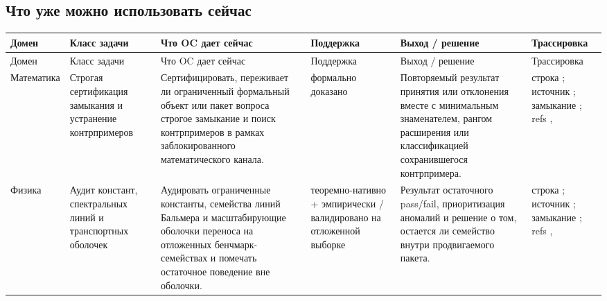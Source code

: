 \subsection{Что уже можно использовать сейчас}
\begingroup
\scriptsize
\setlength{\emergencystretch}{1.5em}
\setlength{\tabcolsep}{2pt}
\setlength{\LTleft}{0pt}
\setlength{\LTright}{0pt}
\begin{longtable}{@{}L{0.11\textwidth}L{0.16\textwidth}L{0.19\textwidth}L{0.12\textwidth}L{0.18\textwidth}L{0.16\textwidth}@{}}
\toprule
Домен & Класс задачи & Что OC дает сейчас & Поддержка & Выход / решение & Трассировка \\
\midrule
\endfirsthead
\toprule
Домен & Класс задачи & Что OC дает сейчас & Поддержка & Выход / решение & Трассировка \\
\midrule
\endhead
Математика & Строгая сертификация замыкания и устранение контрпримеров & Сертифицировать, переживает ли ограниченный формальный объект или пакет вопроса строгое замыкание и поиск контрпримеров в рамках заблокированного математического канала. & формально доказано & Повторяемый результат принятия или отклонения вместе с минимальным знаменателем, рангом расширения или классификацией сохранившегося контрпримера. & строка ; \allowbreak источник ; \allowbreak замыкание ; \allowbreak refs , \allowbreak {} \\
Физика & Аудит констант, спектральных линий и транспортных оболочек & Аудировать ограниченные константы, семейства линий Бальмера и масштабирующие оболочки переноса на отложенных бенчмарк-семействах и помечать остаточное поведение вне оболочки. & теоремно-нативно + эмпирически / валидировано на отложенной выборке & Результат остаточного pass/fail, приоритизация аномалий и решение о том, остается ли семейство внутри продвигаемого пакета. & строка ; \allowbreak источник ; \allowbreak замыкание ; \allowbreak refs , \allowbreak {} \\

\end{longtable}
